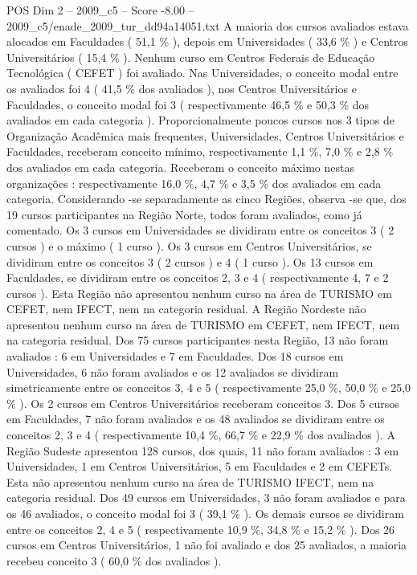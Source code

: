 \begin{textsample}{POS Dim 2 – 2009\_c5 – Score -8.00 – 2009\_c5/enade\_2009\_tur\_dd94a14051.txt}
A maioria dos cursos avaliados estava alocados em Faculdades ( 51,1 \% ), depois em Universidades ( 33,6 \% ) e Centros Universitários ( 15,4 \% ).
Nenhum curso em Centros Federais de Educação Tecnológica ( CEFET ) foi avaliado.
Nas Universidades, o conceito modal entre os avaliados foi 4 ( 41,5 \% dos avaliados ), nos Centros Universitários e Faculdades, o conceito modal foi 3 ( respectivamente 46,5 \% e 50,3 \% dos avaliados em cada categoria ).
Proporcionalmente poucos cursos nos 3 tipos de Organização Acadêmica mais frequentes, Universidades, Centros Universitários e Faculdades, receberam conceito mínimo, respectivamente 1,1 \%, 7,0 \% e 2,8 \% dos avaliados em cada categoria.
Receberam o conceito máximo nestas organizações : respectivamente 16,0 \%, 4,7 \% e 3,5 \% dos avaliados em cada categoria.
Considerando -se separadamente as cinco Regiões, observa -se que, dos 19 cursos participantes na Região Norte, todos foram avaliados, como já comentado.
Os 3 cursos em Universidades se dividiram entre os conceitos 3 ( 2 cursos ) e o máximo ( 1 curso ).
Os 3 cursos em Centros Universitários, se dividiram entre os conceitos 3 ( 2 cursos ) e 4 ( 1 curso ).
Os 13 cursos em Faculdades, se dividiram entre os conceitos 2, 3 e 4 ( respectivamente 4, 7 e 2 cursos ).
Esta Região não apresentou nenhum curso na área de TURISMO em CEFET, nem IFECT, nem na categoria residual.
A Região Nordeste não apresentou nenhum curso na área de TURISMO em CEFET, nem IFECT, nem na categoria residual.
Dos 75 cursos participantes nesta Região, 13 não foram avaliados : 6 em Universidades e 7 em Faculdades.
Dos 18 cursos em Universidades, 6 não foram avaliados e os 12 avaliados se dividiram simetricamente entre os conceitos 3, 4 e 5 ( respectivamente 25,0 \%, 50,0 \% e 25,0 \% ).
Os 2 cursos em Centros Universitários receberam conceitos 3.
Dos 5 cursos em Faculdades, 7 não foram avaliados e os 48 avaliados se dividiram entre os conceitos 2, 3 e 4 ( respectivamente 10,4 \%, 66,7 \% e 22,9 \% dos avaliados ).
A Região Sudeste apresentou 128 cursos, dos quais, 11 não foram avaliados : 3 em Universidades, 1 em Centros Universitários, 5 em Faculdades e 2 em CEFETs.
Esta não apresentou nenhum curso na área de TURISMO IFECT, nem na categoria residual.
Dos 49 cursos em Universidades, 3 não foram avaliados e para os 46 avaliados, o conceito modal foi 3 ( 39,1 \% ).
Os demais cursos se dividiram entre os conceitos 2, 4 e 5 ( respectivamente 10,9 \%, 34,8 \% e 15,2 \% ).
Dos 26 cursos em Centros Universitários, 1 não foi avaliado e dos 25 avaliados, a maioria recebeu conceito 3 ( 60,0 \% dos avaliados ).

\end{textsample}
